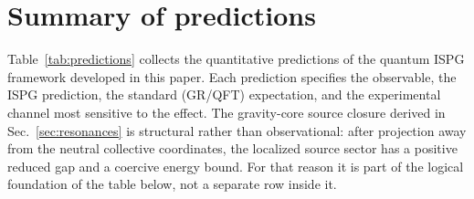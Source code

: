 \documentclass[aps,prd,onecolumn,superscriptaddress,nofootinbib,showpacs,12pt,notitlepage]{revtex4-2}
\begin{document}
\section{Summary of predictions}\label{sec:predictions}

Table~\ref{tab:predictions} collects the quantitative
predictions of the quantum ISPG framework developed in
this paper.  Each prediction specifies the observable,
the ISPG prediction, the standard (GR/QFT) expectation,
and the experimental channel most sensitive to the effect.
The gravity-core source closure derived in
Sec.~\ref{sec:resonances} is structural rather than observational:
after projection away from the neutral collective coordinates, the
localized source sector has a positive reduced gap and a coercive
energy bound.  For that reason it is part of the logical foundation of
the table below, not a separate row inside it.
\end{document}
